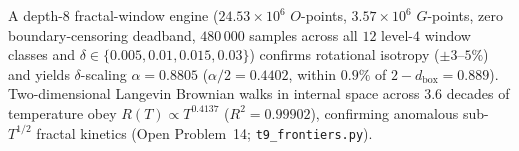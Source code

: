\begin{result}[\numeric]\label{res:langevin-depth8}
A depth-$8$ fractal-window engine ($24.53\times10^6$ $O$-points, $3.57\times10^6$ $G$-points, zero boundary-censoring deadband, $480\,000$ samples across all $12$ level-$4$ window classes and $\delta\in\{0.005,0.01,0.015,0.03\}$) confirms rotational isotropy ($\pm3$--$5\%$) and yields $\delta$-scaling $\alpha=0.8805$ ($\alpha/2=0.4402$, within $0.9\%$ of $2-d_{\mathrm{box}}=0.889$). Two-dimensional Langevin Brownian walks in internal space across $3.6$ decades of temperature obey $R(T)\propto T^{0.4137}$ ($R^2=0.99902$), confirming anomalous sub-$T^{1/2}$ fractal kinetics (Open Problem~14; \texttt{t9\_frontiers.py}).
\end{result}
